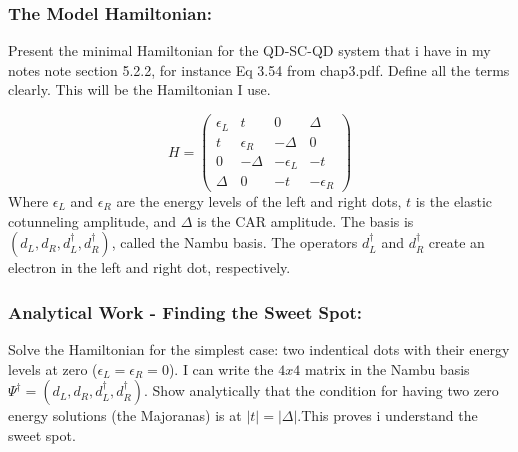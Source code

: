 \documentclass[11pt, letterpaper, titlepage]{article}
\begin{document}
\subsubsection{The Model Hamiltonian:} Present the minimal Hamiltonian for the QD-SC-QD system that i have in my notes note section 5.2.2, for instance Eq 3.54 from chap3.pdf. Define all the terms clearly. This will be the Hamiltonian I use.\par
$$  
  H = \begin{pmatrix}
    ϵ_L & t & 0 & Δ \\
    t & ϵ_R & -Δ & 0 \\
    0 & -Δ & -ϵ_L & -t \\
    Δ & 0 & -t & -ϵ_R
  \end{pmatrix}
$$
Where $ϵ_L$ and $ϵ_R$ are the energy levels of the left and right dots, $t$ is the elastic cotunneling amplitude, and $Δ$ is the CAR amplitude. The basis is $(d_L, d_R, d_L^{†}, d_R^{†})$, called the Nambu basis. The operators $d_L^{†}$ and $d_R^{†}$ create an electron in the left and right dot, respectively.\par

\subsubsection{Analytical Work - Finding the Sweet Spot:} Solve the Hamiltonian for the simplest case: two indentical dots with their energy levels at zero ($ϵ_L = ϵ_R = 0$). I can write the $4x4$ matrix in the Nambu basis $Ψ^{†}= (d_L, d_R, d_L^{†}, d_R^{†})$. Show analytically that the condition for having two zero energy solutions (the Majoranas) is at $|t| = |Δ|$.This proves i understand the sweet spot.\par
\end{document}
